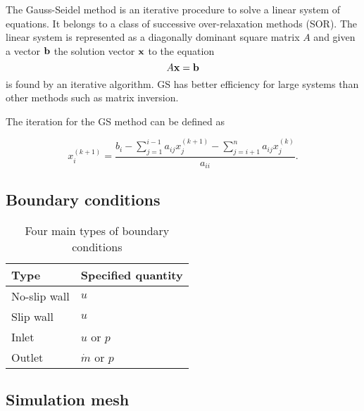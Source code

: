\documentclass[12pt]{article}
\newcommand{\vb}[1]{\text{\textbf{#1}}}
\begin{document}
The Gauss-Seidel method is an iterative procedure to solve a linear system of equations. It belongs to a class of successive over-relaxation methods (SOR). The linear system is represented as a diagonally dominant square matrix $A$ and given a vector $\vb b$ the solution vector $\vb x$ to the equation
$$
A \vb x = \vb b
$$
is found by an iterative algorithm. GS has better efficiency for large systems than other methods such as matrix inversion.

The iteration for the GS method can be defined as \cite[p.~510]{golub}

\begin{equation}
  x_i^{(k + 1)} = \frac{b_i - \sum_{j=1}^{i-1} a_{ij} x_j^{(k + 1)} - \sum_{j=i+1}^{n} a_{ij} x_j^{(k)}}{a_{ii}}.
\end{equation}

\subsection{Boundary conditions}

\indent

\begin{table}[H]
  \centering
  \begin{tabular}{| l | l |}
    \hline
    
    Type & Specified quantity \\
    
    \hline
    
    No-slip wall & $u$ \\

    \hline

    Slip wall & $u$ \\
    
    \hline

    Inlet & $u$ or $p$ \\
    
    \hline

    Outlet & $\dot m$ or $p$\\
    
    \hline
  \end{tabular}
  
  \caption{Four main types of boundary conditions}
\end{table}

\subsection{Simulation mesh}
\end{document}
